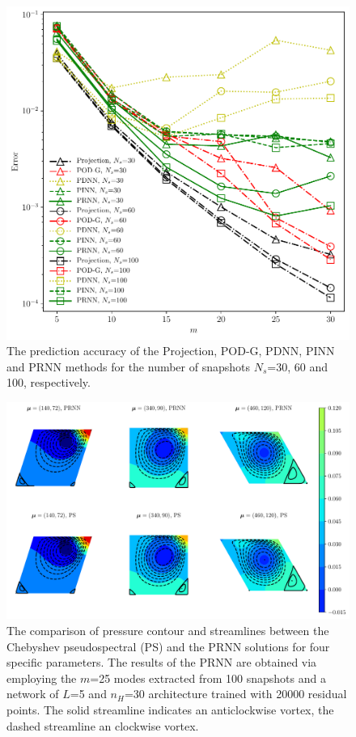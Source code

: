 \documentclass[preprint, 10pt]{elsarticle}
\begin{document}
\begin{figure}[!ht]
  \centering
  \includegraphics[width=12cm]{../../pythonNN/2DLidDriven/fig/ErrorComparsion_SampleNum.pdf}
\caption{The prediction accuracy of the Projection, POD-G, PDNN, PINN and PRNN methods for the number of snapshots $N_s$=30, 60 and 100, respectively.}
\label{fig_2DLidDrivenErrorComparsion_SampleNum}
\end{figure}

\begin{figure}[!ht]
  \centering
  \includegraphics[width=16cm]{../../pythonNN/2DLidDriven/fig/ResultComparsion.pdf}
\caption{The comparison of pressure contour and streamlines between the Chebyshev pseudospectral (PS) and the PRNN solutions for four specific parameters. The results of the PRNN are obtained via employing the $m$=25 modes extracted from 100 snapshots and a network of $L$=5 and $n_H$=30 architecture trained with 20000 residual points. The solid streamline indicates an anticlockwise vortex, the dashed streamline an clockwise vortex.}
\label{fig_2DLidDrivenResultComparsion}
\end{figure}
\end{document}
